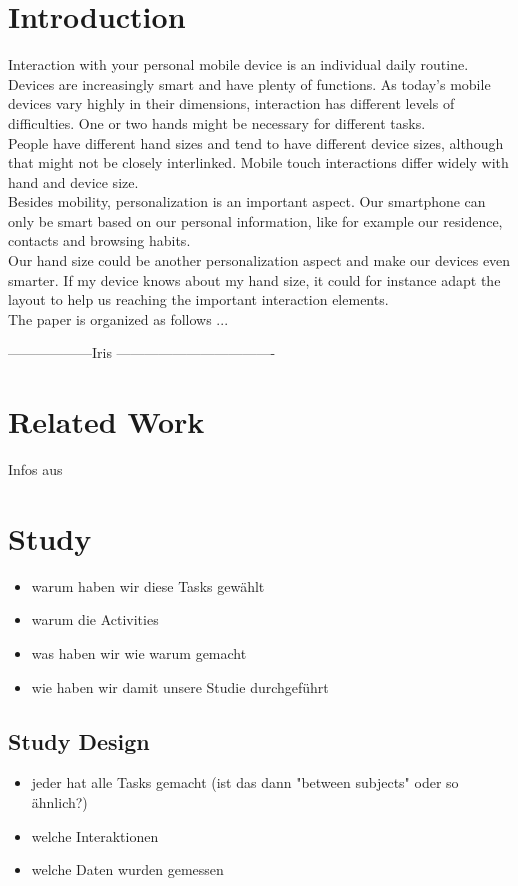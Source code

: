 \documentclass{sigchi}
\begin{document}
\section{Introduction}
Interaction with your personal mobile device is an individual daily routine. Devices are increasingly smart and have plenty of functions. As today's mobile devices vary highly in their dimensions, interaction has different levels of difficulties. One or two hands might be necessary for different tasks.\\
People have different hand sizes and tend to have different device sizes, although that might not be closely interlinked. Mobile touch interactions differ widely with hand and device size.\\
Besides mobility, personalization is an important aspect. Our smartphone can only be smart based on our personal information, like for example our residence, contacts and browsing habits.\\
Our hand size could be another personalization aspect and make our devices even smarter. If my device knows about my hand size, it could for instance adapt the layout to help us reaching the important interaction elements.\\
The paper is organized as follows ...

------------------Iris ----------------------------------
\section{Related Work}
Infos aus \cite{boring2012fat}

\section{Study}
\begin{itemize}
\item warum haben wir diese Tasks gewählt
\item warum die Activities
\item was haben wir wie warum gemacht
\item wie haben wir damit unsere Studie durchgeführt
\end{itemize}

\subsection{Study Design}
\begin{itemize}
\item jeder hat alle Tasks gemacht (ist das dann "between subjects" oder so ähnlich?)
\item welche Interaktionen
\item welche Daten wurden gemessen
\end{itemize}
\end{document}

